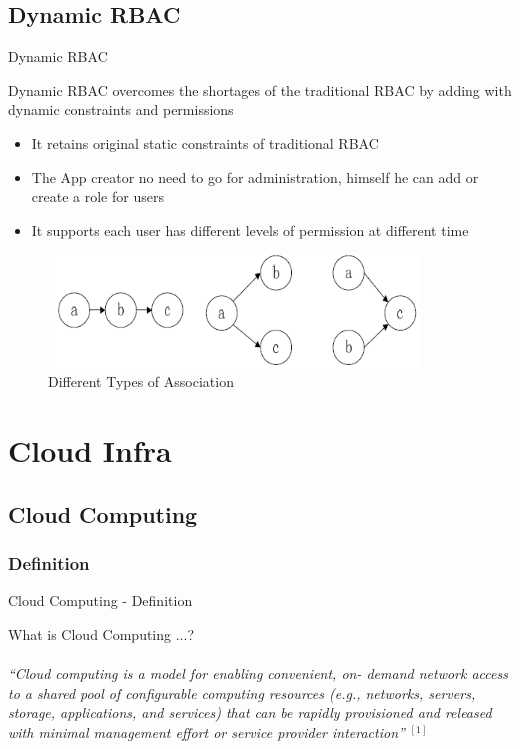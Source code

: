 \documentclass[10pt,xcolor=dvipsnames]{beamer}
\begin{document}
\subsection{Dynamic RBAC}
\begin{frame}{Dynamic RBAC}

Dynamic RBAC overcomes the shortages of the traditional RBAC by adding with dynamic constraints and  permissions
\begin{itemize}
 \item It retains original static constraints of traditional RBAC
 \item The App creator no need to go for administration, himself he can add or create a role for users
 \item It supports each user has different levels of permission at different time
\end{itemize}
\begin{figure}[H]
\includegraphics[width=10cm,height=3cm]{ass}
\caption{Different Types of Association}
\end{figure}
\end{frame}



\section{Cloud Infra}
\subsection{Cloud Computing}
\subsubsection{Definition  }
\begin{frame}{Cloud Computing - Definition }

What is Cloud Computing ...? \\
\hspace{4cm} \\
\textit{``Cloud computing is a model for enabling convenient, on-
demand network access to a shared pool of configurable
computing resources (e.g., networks, servers, storage,
applications, and services) that can be rapidly provisioned
and released with minimal management effort or service
provider interaction''} $ ^{[1]} $

\end{frame}
\end{document}
